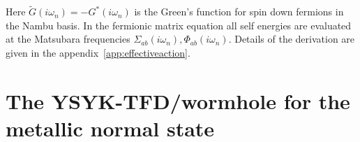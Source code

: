 Here $\tilde{G}(i\omega_n)=-G^\ast(i\omega_n)$ is the Green's function for spin down fermions in the Nambu basis.
In the fermionic matrix equation all self energies are evaluated at the Matsubara frequencies $\Sigma_{ab}(i\omega_n), \Phi_{ab}(i\omega_n)$.
Details of the derivation are given in the appendix~\ref{app:effectiveaction}. 



\section{The YSYK-TFD/wormhole for the metallic normal state}
\label{sec:metallic-state}
%
%

